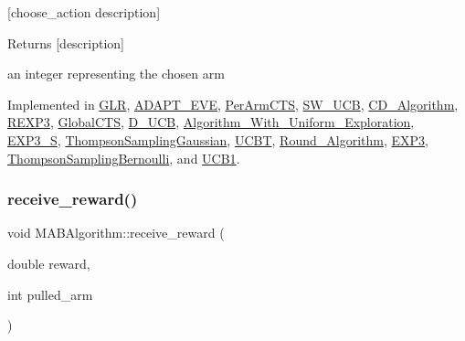 \mbox{[}choose\+\_\+action description\mbox{]} \begin{DoxyReturn}{Returns}
\mbox{[}description\mbox{]} 

an integer representing the chosen arm 
\end{DoxyReturn}


Implemented in \mbox{\hyperlink{class_g_l_r_ad6b3e9f19e0bea4d6067b491c33640e0}{G\+LR}}, \mbox{\hyperlink{class_a_d_a_p_t___e_v_e_aa878cacd23fbe8743493623f8a9be6d6}{A\+D\+A\+P\+T\+\_\+\+E\+VE}}, \mbox{\hyperlink{class_per_arm_c_t_s_ab8904bef227b13aed75aade589421c5a}{Per\+Arm\+C\+TS}}, \mbox{\hyperlink{class_s_w___u_c_b_a819ec3b60cd7a8e5f3983b979d3d765f}{S\+W\+\_\+\+U\+CB}}, \mbox{\hyperlink{class_c_d___algorithm_a10d80cbf4687e2c0ef69466ee6deb1a9}{C\+D\+\_\+\+Algorithm}}, \mbox{\hyperlink{class_r_e_x_p3_aba9cbcdc74602157701b022a7758d584}{R\+E\+X\+P3}}, \mbox{\hyperlink{class_global_c_t_s_a48f9873be9f993e78fdbdd93ad4806bc}{Global\+C\+TS}}, \mbox{\hyperlink{class_d___u_c_b_ac48b99c21eb02361707988f6ac012408}{D\+\_\+\+U\+CB}}, \mbox{\hyperlink{class_algorithm___with___uniform___exploration_a42d5f75def328c83dce00f73dbe26d58}{Algorithm\+\_\+\+With\+\_\+\+Uniform\+\_\+\+Exploration}}, \mbox{\hyperlink{class_e_x_p3___s_afc9e4825004f5f541f774ac0debe6bee}{E\+X\+P3\+\_\+S}}, \mbox{\hyperlink{class_thompson_sampling_gaussian_a36e15e9a5d9f5cae94fef686c2cbb4be}{Thompson\+Sampling\+Gaussian}}, \mbox{\hyperlink{class_u_c_b_t_a6bebf23b2dd926e49794a4fb0fefe358}{U\+C\+BT}}, \mbox{\hyperlink{class_round___algorithm_a019a9a7a564a49512f5089c3829e6f4e}{Round\+\_\+\+Algorithm}}, \mbox{\hyperlink{class_e_x_p3_adb52fc51fbc5ef97e3d67c2437634be8}{E\+X\+P3}}, \mbox{\hyperlink{class_thompson_sampling_bernoulli_a80f2f22f0bbf71b60a7a7133ce49d917}{Thompson\+Sampling\+Bernoulli}}, and \mbox{\hyperlink{class_u_c_b1_ac71b279c529fdcca156e984550ad3ed3}{U\+C\+B1}}.

\mbox{\label{class_m_a_b_algorithm_aa584b3d6b86fa050e3389be9781b5782}} 
\subsubsection{\texorpdfstring{receive\+\_\+reward()}{receive\_reward()}}
{\footnotesize\ttfamily void M\+A\+B\+Algorithm\+::receive\+\_\+reward (\begin{DoxyParamCaption}\item[{double}]{reward,  }\item[{int}]{pulled\+\_\+arm }\end{DoxyParamCaption})\hspace{0.3cm}{\ttfamily [virtual]}}



